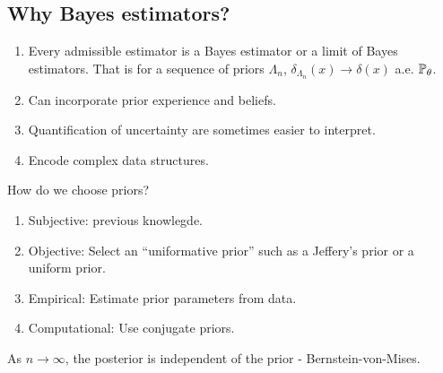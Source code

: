 \subsection{Why Bayes estimators?}
\begin{enumerate}
    \item Every admissible estimator is a Bayes estimator or a limit of Bayes estimators. That is for a sequence of priors $\Lambda_n$, $\delta_{\Lambda_n}(x) \to \delta(x)$ a.e. ${\mathbb{P}}_{\theta}$.
    \item Can incorporate prior experience and beliefs.
    \item Quantification of uncertainty are sometimes easier to interpret.
    \item Encode complex data structures.
\end{enumerate}
How do we choose priors?
\begin{enumerate}
    \item Subjective: previous knowlegde.
    \item Objective: Select an ``uniformative prior'' such as a Jeffery's prior or a uniform prior.
    \item Empirical: Estimate prior parameters from data.
    \item Computational: Use conjugate priors.
\end{enumerate}
As $n \to \infty$, the posterior is independent of the prior - Bernstein-von-Mises.
